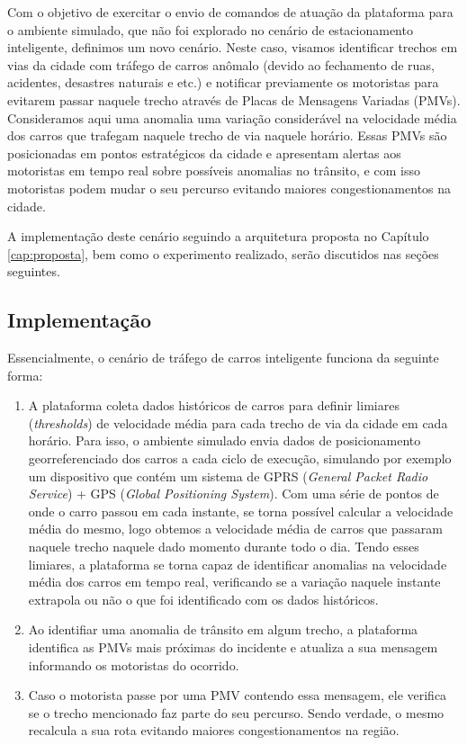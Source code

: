 Com o objetivo de exercitar o envio de comandos de atuação da plataforma para o ambiente simulado, que não foi explorado no cenário de estacionamento inteligente, definimos um novo cenário.
Neste caso, visamos identificar trechos em vias da cidade com tráfego de carros anômalo (devido ao fechamento de ruas, acidentes, desastres naturais e etc.) e notificar
previamente os motoristas para evitarem passar naquele trecho através de Placas de Mensagens Variadas (PMVs).
Consideramos aqui uma anomalia uma variação considerável na velocidade média dos carros que trafegam naquele trecho de via naquele horário.
Essas PMVs são posicionadas em pontos estratégicos da cidade e apresentam alertas aos motoristas em tempo real sobre possíveis anomalias no trânsito, e com isso motoristas
podem mudar o seu percurso evitando maiores congestionamentos na cidade.

A implementação deste cenário seguindo a arquitetura proposta no Capítulo \ref{cap:proposta}, bem como o experimento realizado, serão discutidos nas seções seguintes.

\subsection{Implementação}
\label{sec:smart_traffic}

Essencialmente, o cenário de tráfego de carros inteligente funciona da seguinte forma:

\begin{enumerate}
    \item A plataforma coleta dados históricos de carros para definir limiares (\textit{thresholds}) de velocidade média para cada trecho de via da cidade em cada horário.
        Para isso, o ambiente simulado envia dados de posicionamento georreferenciado dos carros a cada ciclo de execução, simulando por exemplo um dispositivo que contém um
        sistema de GPRS (\textit{General Packet Radio Service}) + GPS (\textit{Global Positioning System}).
        Com uma série de pontos de onde o carro passou em cada instante, se torna possível calcular a velocidade média do mesmo, logo obtemos a velocidade média de carros
        que passaram naquele trecho naquele dado momento durante todo o dia.
        Tendo esses limiares, a plataforma se torna capaz de identificar anomalias na velocidade média dos carros em tempo real, verificando se a variação naquele instante
        extrapola ou não o que foi identificado com os dados históricos.

    \item Ao identifiar uma anomalia de trânsito em algum trecho, a plataforma identifica as PMVs mais próximas do incidente e atualiza a sua mensagem informando os motoristas
        do ocorrido.

    \item Caso o motorista passe por uma PMV contendo essa mensagem, ele verifica se o trecho mencionado faz parte do seu percurso. Sendo verdade, o mesmo recalcula a sua
        rota evitando maiores congestionamentos na região.
\end{enumerate}

